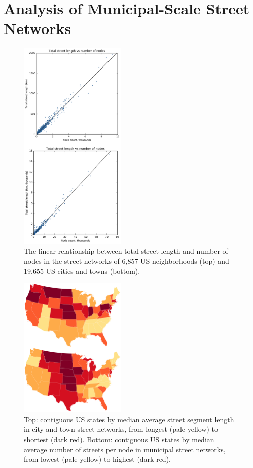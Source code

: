 \documentclass[Afour,sageh,times]{sage/sagej}
\begin{document}
\section{Analysis of Municipal-Scale Street Networks}

\begin{figure}[h]
\includegraphics[width=0.45\textwidth]{media/fig03.png}
\caption{The linear relationship between total street length and number of nodes in the street networks of 6,857 US neighborhoods (top) and 19,655 US cities and towns (bottom).}
\label{fig03}
\end{figure}

\begin{figure}[h]
\includegraphics[width=0.45\textwidth]{media/fig04.png}
\caption{Top: contiguous US states by median average street segment length in city and town street networks, from longest (pale yellow) to shortest (dark red). Bottom: contiguous US states by median average number of streets per node in municipal street networks, from lowest (pale yellow) to highest (dark red).}
\label{fig04}
\end{figure}
\end{document}
